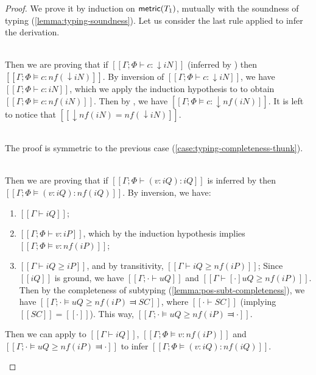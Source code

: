 \lemmaTypingCompleteness*
\begin{proof}
    We prove it by induction on $\mathsf{metric}(T_1)$, mutually with 
    the soundness of typing (\cref{lemma:typing-soundness}).
    Let us consider the last rule applied to infer the derivation.
    \begin{caseof}

        \item {}\\
            \label{case:typing-completeness-thunk}
            Then we are proving that if 
            $[[Γ; Φ ⊢ {c} : ↓iN]]$ (inferred by )
            then $[[Γ; Φ ⊨ {c} : nf(↓iN)]]$.
            By inversion of $[[Γ; Φ ⊢ {c} : ↓iN]]$, we have
            $[[Γ; Φ ⊢ c : iN]]$, which we apply the induction hypothesis to
            to obtain $[[Γ; Φ ⊨ c : nf(iN)]]$.
            Then by , we have $[[Γ; Φ ⊨ {c} : ↓nf(iN)]]$.
            It is left to notice that $[[↓nf(iN) = nf(↓iN)]]$.

        \item {}\\
            The proof is symmetric to the previous case 
            (\cref{case:typing-completeness-thunk}).

        \item {}\\
            \label{case:typing-completeness-pannot}
            Then we are proving that if
            $[[Γ; Φ ⊢ (v : iQ) : iQ]]$ is inferred by 
            then $[[Γ; Φ ⊨ (v : iQ) : nf(iQ)]]$.
            By inversion, we have:
            \begin{enumerate}
                \item $[[Γ ⊢ iQ]]$;
                \item $[[Γ; Φ ⊢ v : iP]]$, which
                    by the induction hypothesis implies $[[Γ; Φ ⊨ v : nf(iP)]]$;
                \item $[[Γ ⊢ iQ ≥ iP]]$, and by transitivity, $[[Γ ⊢ iQ ≥ nf(iP)]]$;
                    Since $[[iQ]]$ is ground, 
                    we have $[[Γ ; · ⊢ uQ]]$ and $[[Γ ⊢ [·]uQ ≥ nf(iP)]]$.
                    Then by the completeness of subtyping
                    (\cref{lemma:pos-subt-completeness}), we have 
                    $[[Γ ; · ⊨ uQ ≥ nf(iP) ⫤ SC]]$, where $[[· ⊢ SC]]$ 
                    (implying $[[SC]] = [[·]]$).
                    This way, $[[Γ ; · ⊨ uQ ≥ nf(iP) ⫤ ·]]$.
            \end{enumerate}
            Then we can apply  to
            $[[Γ ⊢ iQ]]$, $[[Γ; Φ ⊨ v : nf(iP)]]$ and $[[Γ ; · ⊨ uQ ≥ nf(iP) ⫤ ·]]$
            to infer $[[Γ; Φ ⊨ (v : iQ) : nf(iQ)]]$.


\end{caseof}
\end{proof}
